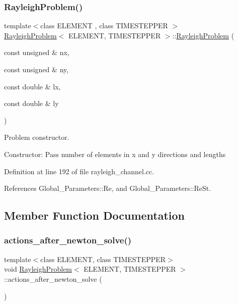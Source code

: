 \subsubsection{\texorpdfstring{Rayleigh\+Problem()}{RayleighProblem()}}
{\footnotesize\ttfamily template$<$class E\+L\+E\+M\+E\+NT , class T\+I\+M\+E\+S\+T\+E\+P\+P\+ER $>$ \\
\hyperlink{classRayleighProblem}{Rayleigh\+Problem}$<$ E\+L\+E\+M\+E\+NT, T\+I\+M\+E\+S\+T\+E\+P\+P\+ER $>$\+::\hyperlink{classRayleighProblem}{Rayleigh\+Problem} (\begin{DoxyParamCaption}\item[{const unsigned \&}]{nx,  }\item[{const unsigned \&}]{ny,  }\item[{const double \&}]{lx,  }\item[{const double \&}]{ly }\end{DoxyParamCaption})}



Problem constructor. 

Constructor\+: Pass number of elements in x and y directions and lengths 

Definition at line 192 of file rayleigh\+\_\+channel.\+cc.



References Global\+\_\+\+Parameters\+::\+Re, and Global\+\_\+\+Parameters\+::\+Re\+St.



\subsection{Member Function Documentation}
\mbox{\label{classRayleighProblem_a833938f3e1b592571729b2bbea3bb9d2}} 
\subsubsection{\texorpdfstring{actions\+\_\+after\+\_\+newton\+\_\+solve()}{actions\_after\_newton\_solve()}}
{\footnotesize\ttfamily template$<$class E\+L\+E\+M\+E\+NT, class T\+I\+M\+E\+S\+T\+E\+P\+P\+ER$>$ \\
void \hyperlink{classRayleighProblem}{Rayleigh\+Problem}$<$ E\+L\+E\+M\+E\+NT, T\+I\+M\+E\+S\+T\+E\+P\+P\+ER $>$\+::actions\+\_\+after\+\_\+newton\+\_\+solve (\begin{DoxyParamCaption}{ }\end{DoxyParamCaption})\hspace{0.3cm}{\ttfamily [inline]}}



